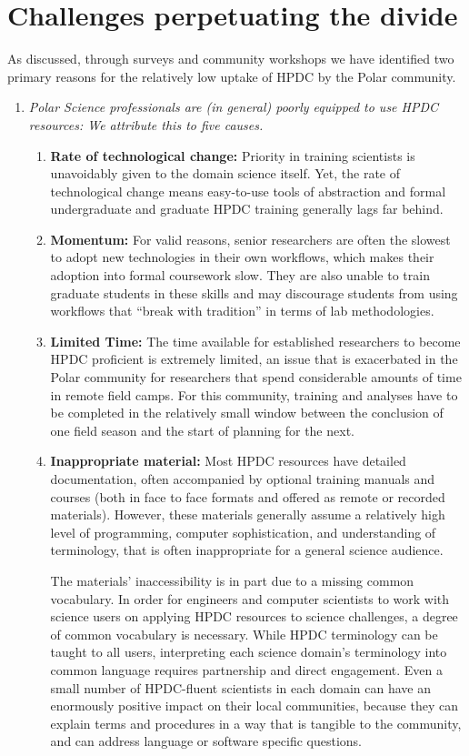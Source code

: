 \documentclass[conference]{IEEEtran}
\begin{document}
\section{Challenges perpetuating the divide}
As discussed, through surveys and community workshops we have identified two primary reasons for the relatively low uptake of HPDC by the Polar community.  

\begin{enumerate}[\setlength{\listparindent}{\parindent}]
\item \textit{Polar Science professionals are (in general) poorly equipped to use HPDC resources:
We attribute this to five causes.}
\begin{enumerate}
\item \textbf{Rate of technological change:} Priority in training scientists is unavoidably given to the domain science itself. Yet, the rate of technological change means easy-to-use tools of abstraction and formal undergraduate and graduate HPDC training generally lags far behind. 
\item \textbf{Momentum: }For valid reasons, senior researchers are often the slowest to adopt new technologies in their own workflows\cite{}, which makes their adoption into formal coursework slow. They are also unable to train graduate students in these skills and may discourage students from using workflows that ``break with tradition'' in terms of lab methodologies.
\item \textbf{Limited Time: }The time available for established researchers to become HPDC proficient is extremely limited, an issue that is exacerbated in the Polar community for researchers that spend considerable amounts of time in remote field camps. For this community, training and analyses have to be completed in the relatively small window between the conclusion of one field season and the start of planning for the next. 
\item \textbf{Inappropriate material: }Most HPDC resources have detailed documentation, often accompanied by optional training manuals and courses (both in face to face formats and offered as remote or recorded materials). However, these materials generally assume a relatively high level of programming, computer sophistication, and understanding of terminology, that is often inappropriate for a general science audience.  

The materials' inaccessibility is in part due to a missing common vocabulary. In order for engineers and computer scientists to work with science users on applying HPDC resources to science challenges, a degree of common vocabulary is necessary. While HPDC terminology can be taught to all users, interpreting each science domain’s terminology into common language requires partnership and direct engagement. Even a small number of HPDC-fluent scientists in each domain can have an enormously positive impact on their local communities, because they can explain terms and procedures in a way that is tangible to the community, and can address language or software specific questions.


\end{enumerate}
\end{enumerate}
\end{document}

